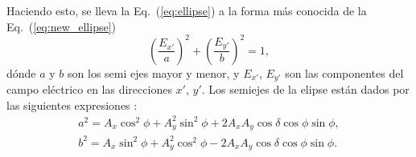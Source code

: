Haciendo esto, se lleva la
Eq.~(\ref{eq:ellipse}) a la forma más conocida de la Eq.~(\ref{eq:new_ellipse})
\begin{equation}
\left(\frac{E_{x'}}{a}\right)^2+\left(\frac{E_{y'}}{b}\right)^2 = 1,
\label{eq:new_ellipse}
\end{equation}
dónde $a$ y $b$ son los semi ejes mayor y menor, y $E_{x'}$, $E_{y'}$
son las componentes del campo eléctrico en las direcciones $x'$,
$y'$. Los semiejes de la elipse están dados por las siguientes
expresiones :
\begin{align*}
a^2 = A_x\cos^2{\phi}+A_y^2\sin^2{\phi} +2A_xA_y \cos{\delta}\cos{\phi}\sin{\phi},\\
b^2 = A_x\sin^2{\phi}+A_y^2\cos^2{\phi} -2A_xA_y \cos{\delta}\cos{\phi}\sin{\phi}.
\end{align*}

